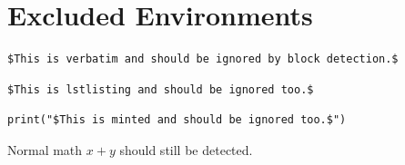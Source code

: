 \section{Excluded Environments}
\begin{verbatim}
$This is verbatim and should be ignored by block detection.$
\end{verbatim}

\begin{lstlisting}
$This is lstlisting and should be ignored too.$
\end{lstlisting}

\begin{verbatim}
print("$This is minted and should be ignored too.$")
\end{verbatim}

Normal math $x+y$ should still be detected.
